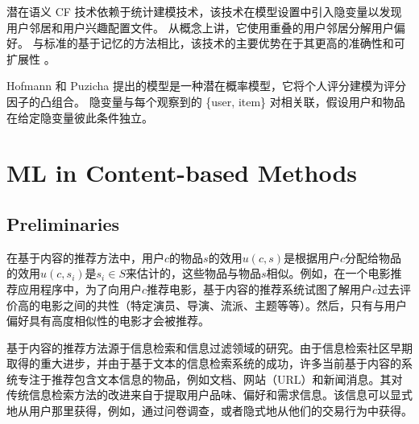 \documentclass[sigconf]{acmart}
\begin{document}
潜在语义 CF 技术依赖于统计建模技术，该技术在模型设置中引入隐变量以发现用户邻居和用户兴趣配置文件。 从概念上讲，它使用重叠的用户邻居分解用户偏好。 与标准的基于记忆的方法相比，该技术的主要优势在于其更高的准确性和可扩展性 \cite{hofmann2004latent, hofmann2001unsupervised}。

Hofmann 和 Puzicha \cite{hofmann1999latent} 提出的模型是一种潜在概率模型，它将个人评分建模为评分因子的凸组合。 隐变量与每个观察到的 \{user, item\} 对相关联，假设用户和物品在给定隐变量彼此条件独立。



\section{ML in Content-based Methods}

\subsection{Preliminaries}

在基于内容的推荐方法中，用户$c$的物品$s$的效用$u(c, s)$是根据用户$c$分配给物品的效用$u(c,s_i)$是$s_i\in S$来估计的，这些物品与物品$s$相似。例如，在一个电影推荐应用程序中，为了向用户$c$推荐电影，基于内容的推荐系统试图了解用户$c$过去评价高的电影之间的共性（特定演员、导演、流派、主题等等）。然后，只有与用户偏好具有高度相似性的电影才会被推荐。

基于内容的推荐方法源于信息检索和信息过滤领域的研究。由于信息检索社区早期取得的重大进步，并由于基于文本的信息检索系统的成功，许多当前基于内容的系统专注于推荐包含文本信息的物品，例如文档、网站（URL）和新闻消息。其对传统信息检索方法的改进来自于提取用户品味、偏好和需求信息。该信息可以显式地从用户那里获得，例如，通过问卷调查，或者隐式地从他们的交易行为中获得。
\end{document}
